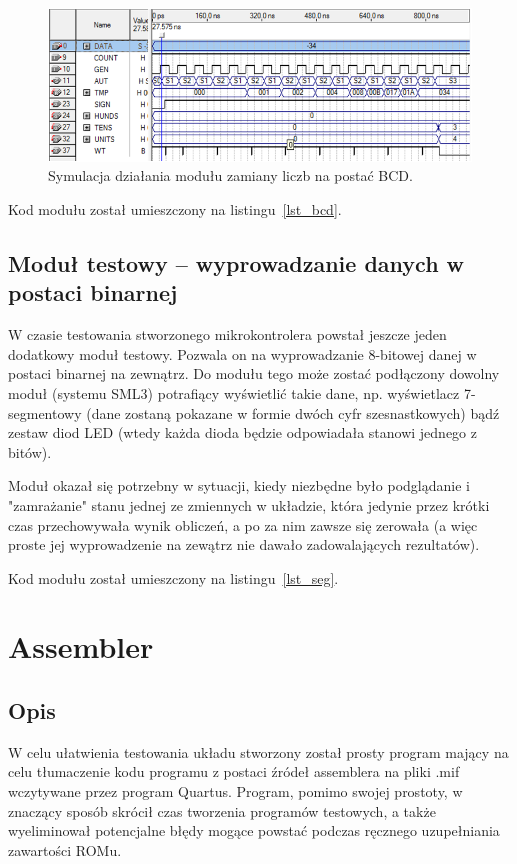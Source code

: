 \documentclass[a4paper,12pt]{report}
\begin{document}
\begin{figure}[h]
\centering
\includegraphics[width=16cm]{./pict/BCD_sim.png}
\caption{Symulacja działania modułu zamiany liczb na postać BCD.}
\label{fig:lBCD_sim}
\end{figure}

Kod modułu został umieszczony na listingu~\ref{lst_bcd}.

\section{Moduł testowy -- wyprowadzanie danych w postaci binarnej}
W czasie testowania stworzonego mikrokontrolera powstał jeszcze jeden dodatkowy moduł testowy. Pozwala on na wyprowadzanie 8-bitowej danej w postaci binarnej na zewnątrz. Do modułu tego może zostać podłączony dowolny moduł (systemu SML3) potrafiący wyświetlić takie dane, np. wyświetlacz 7-segmentowy (dane zostaną pokazane w formie dwóch cyfr szesnastkowych) bądź zestaw diod LED (wtedy każda dioda będzie odpowiadała stanowi jednego z bitów).

Moduł okazał się potrzebny w sytuacji, kiedy niezbędne było podglądanie i "zamrażanie" stanu jednej ze zmiennych w układzie, która jedynie przez krótki czas przechowywała wynik obliczeń, a po za nim zawsze się zerowała (a więc proste jej wyprowadzenie na zewątrz nie dawało zadowalających rezultatów).

Kod modułu został umieszczony na listingu~\ref{lst_seg}.

\chapter{Assembler}

\section{Opis}

W celu ułatwienia testowania układu stworzony został prosty program mający na celu tłumaczenie kodu programu z postaci źródeł assemblera na pliki .mif wczytywane przez program Quartus. Program, pomimo swojej prostoty, w znaczący sposób skrócił czas tworzenia programów testowych, a także wyeliminował potencjalne błędy mogące powstać podczas ręcznego uzupełniania zawartości ROMu.
\end{document}
